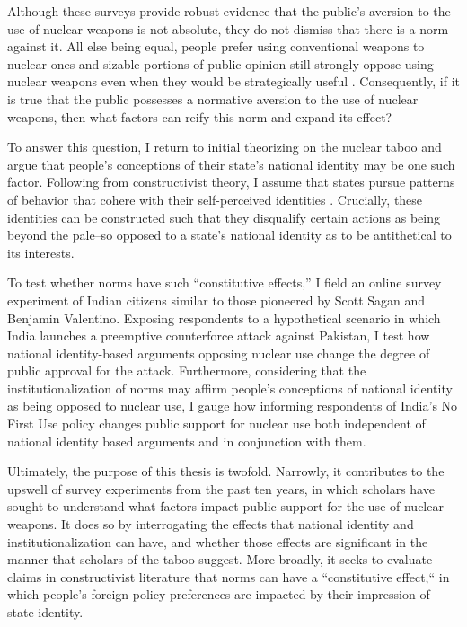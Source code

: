 \documentclass[12pt]{article}
\begin{document}
Although these surveys provide robust evidence that the public's aversion to the use of nuclear weapons is not absolute, they do not dismiss that there is a norm against it. All else being equal, people prefer using conventional weapons to nuclear ones and sizable portions of public opinion still strongly oppose using nuclear weapons even when they would be strategically useful \citep{press_atomic_2013}. Consequently, if it is true that the public possesses a normative aversion to the use of nuclear weapons, then what factors can reify this norm and expand its effect?

To answer this question, I return to initial theorizing on the nuclear taboo and argue that people's conceptions of their state's national identity may be one such factor. Following from constructivist theory, I assume that states pursue patterns of behavior that cohere with their self-perceived identities \citep{tannenwald_nuclear_2007,wendt_social_1999}. Crucially, these identities can be constructed such that they disqualify certain actions as being beyond the pale--so opposed to a state's national identity as to be antithetical to its interests.

To test whether norms have such “constitutive effects,” I field an online survey experiment of Indian citizens similar to those pioneered by Scott Sagan and Benjamin Valentino. Exposing respondents to a hypothetical scenario in which India launches a preemptive counterforce attack against Pakistan, I test how national identity-based arguments opposing nuclear use change the degree of public approval for the attack. Furthermore, considering that the institutionalization of norms may affirm people's conceptions of national identity as being opposed to nuclear use, I gauge how informing respondents of India's No First Use policy changes public support for nuclear use both independent of national identity based arguments and in conjunction with them.

Ultimately, the purpose of this thesis is twofold. Narrowly, it contributes to the upswell of survey experiments from the past ten years, in which scholars have sought to understand what factors impact public support for the use of nuclear weapons. It does so by interrogating the effects that national identity and institutionalization can have, and whether those effects are significant in the manner that scholars of the taboo suggest. More broadly, it seeks to evaluate claims in constructivist literature that norms can have a “constitutive effect,“ in which people's foreign policy preferences are impacted by their impression of state identity.
\end{document}
